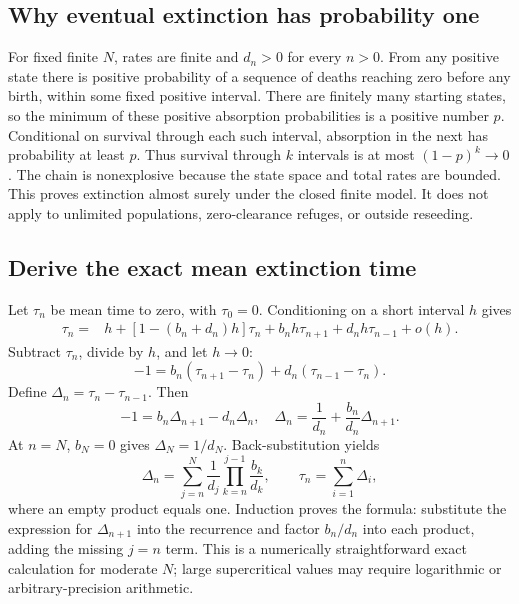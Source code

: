 \documentclass[11pt]{article}
\begin{document}
\subsection{Why eventual extinction has probability one}
For fixed finite $N$, rates are finite and $d_n>0$ for every $n>0$. From any positive state there is positive probability of a sequence of deaths reaching zero before any birth, within some fixed positive interval. There are finitely many starting states, so the minimum of these positive absorption probabilities is a positive number $p$. Conditional on survival through each such interval, absorption in the next has probability at least $p$. Thus survival through $k$ intervals is at most $(1-p)^k\to0$. The chain is nonexplosive because the state space and total rates are bounded. This proves extinction almost surely under the closed finite model. It does not apply to unlimited populations, zero-clearance refuges, or outside reseeding.

\subsection{Derive the exact mean extinction time}
Let $\tau_n$ be mean time to zero, with $\tau_0=0$. Conditioning on a short interval $h$ gives
\begin{align}
\tau_n={}&h+[1-(b_n+d_n)h]\tau_n
+b_nh\tau_{n+1}+d_nh\tau_{n-1}+o(h).
\end{align}
Subtract $\tau_n$, divide by $h$, and let $h\to0$:
\begin{equation}\label{eq:backward}
-1=b_n(\tau_{n+1}-\tau_n)+d_n(\tau_{n-1}-\tau_n).
\end{equation}
Define $\Delta_n=\tau_n-\tau_{n-1}$. Then
\begin{equation}
-1=b_n\Delta_{n+1}-d_n\Delta_n,
\quad \Delta_n=\frac1{d_n}+\frac{b_n}{d_n}\Delta_{n+1}.
\end{equation}
At $n=N$, $b_N=0$ gives $\Delta_N=1/d_N$. Back-substitution yields
\begin{equation}\label{eq:sum}
\Delta_n=\sum_{j=n}^N\frac1{d_j}\prod_{k=n}^{j-1}\frac{b_k}{d_k},
\qquad\tau_n=\sum_{i=1}^n\Delta_i,
\end{equation}
where an empty product equals one. Induction proves the formula: substitute the expression for $\Delta_{n+1}$ into the recurrence and factor $b_n/d_n$ into each product, adding the missing $j=n$ term. This is a numerically straightforward exact calculation for moderate $N$; large supercritical values may require logarithmic or arbitrary-precision arithmetic.
\end{document}
